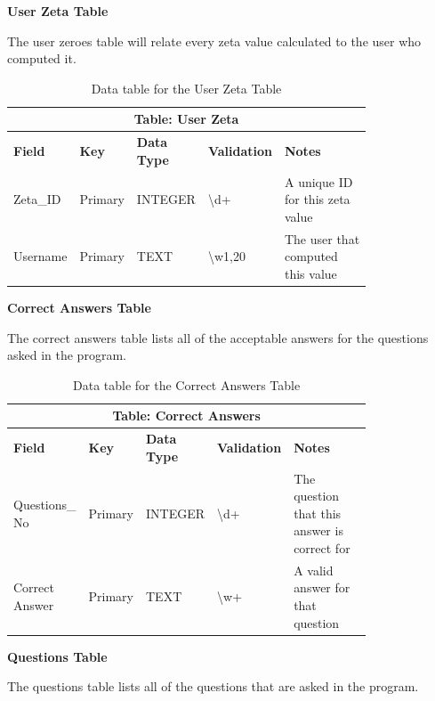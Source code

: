 \documentclass{article}
\begin{document}
\clearpage
\textbf{User Zeta Table}

The user zeroes table will relate every  zeta value calculated to the user who computed it.

\begin{table}[ht]
    \centering
    \begin{tabular}{ | p{0.15\linewidth} | p{0.1\linewidth} | p{0.16\linewidth} | p{0.14\linewidth} | p{0.25\linewidth} | }
    \hline
    \multicolumn{5}{|c|}{\textbf{Table: User Zeta}}\\
    \hline
    \hline
    \textbf{Field} & \textbf{Key} & \textbf{Data Type} & \textbf{Validation} & \textbf{Notes} \\
    \hline
    Zeta\_ID & Primary & INTEGER & \textbackslash d+ & A unique ID for this zeta value\\
    \hline
    Username & Primary & TEXT & \textbackslash w{1,20}& The user that computed this value\\
    \hline
    \end{tabular}
    \caption{Data table for the User Zeta Table}
\end{table}


\textbf{Correct Answers Table}

The correct answers table lists all of the acceptable answers for the questions asked in the program.

\begin{table}[ht]
    \centering
    \begin{tabular}{ | p{0.15\linewidth} | p{0.1\linewidth} | p{0.16\linewidth} | p{0.14\linewidth} | p{0.25\linewidth} | }
    \hline
    \multicolumn{5}{|c|}{\textbf{Table: Correct Answers}}\\
    \hline
    \hline
    \textbf{Field} & \textbf{Key} & \textbf{Data Type} & \textbf{Validation} & \textbf{Notes} \\
    \hline
    Questions\_ No & Primary & INTEGER & \textbackslash d+ & The question that this answer is correct for\\
    \hline
    Correct \text{ } Answer & Primary & TEXT & \textbackslash w+ & A valid answer for that question\\
    \hline
    \end{tabular}
    \caption{Data table for the Correct Answers Table}
\end{table}

\textbf{Questions Table}

The questions table lists all of the questions that are asked in the program.
\end{document}

